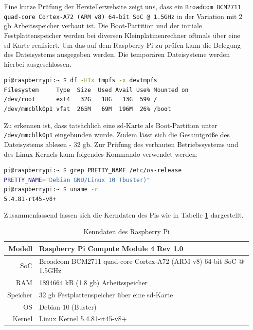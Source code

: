 Eine kurze Prüfung der Herstellerwebsite zeigt uns, dass ein \texttt{Broadcom BCM2711 quad-core Cortex-A72 (ARM v8) 64-bit SoC @ 1.5GHz}
in der Variation mit \num{2} \gls{gb} Arbeitsspeicher verbaut ist.
Die Boot-Partition und der initiale Festplattenspeicher werden bei diversen Kleinplatinenrechner oftmals über eine \gls{sd}-Karte
realisiert.
Um das auf dem Raspberry Pi zu prüfen kann die Belegung des Dateisystems ausgegeben werden.
Die temporären Dateisysteme werden hierbei ausgeschlossen.

\begin{lstlisting}[language=sh, label=lst:pi-sd]
pi@raspberrypi:~ $ df -HTx tmpfs -x devtmpfs
Filesystem     Type  Size  Used Avail Use% Mounted on
/dev/root      ext4   32G   18G   13G  59% /
/dev/mmcblk0p1 vfat  265M   69M  196M  26% /boot
\end{lstlisting}

Zu erkennen ist, dass tatsächlich eine \gls{sd}-Karte als Boot-Partition unter \texttt{/dev/mmcblk0p1} eingebunden wurde.
Zudem lässt sich die Gesamtgröße des Dateisystems ablesen - \num{32} \gls{gb}.
Zur Prüfung des verbauten Betriebssystems und des Linux Kernels kann folgendes Kommando verwendet werden:

\begin{lstlisting}[language=sh, label=lst:pi-os]
pi@raspberrypi:~ $ grep PRETTY_NAME /etc/os-release
PRETTY_NAME="Debian GNU/Linux 10 (buster)"
pi@raspberrypi:~ $ uname -r
5.4.81-rt45-v8+
\end{lstlisting}

Zusammenfassend lassen sich die Kerndaten des Pis wie in Tabelle \ref{tab:data-raspi} dargestellt.

\begin{table}[h]
    \centering
    \begin{tabular}{|r|l|}
        \hline
        Modell   & Raspberry Pi Compute Module 4 Rev 1.0\\ \hline
        SoC      & Broadcom BCM2711 quad-core Cortex-A72 (ARM v8) 64-bit SoC @ 1.5GHz\\ \hline
        RAM      & \num{1894664} kB (\num{1,8} \gls{gb}) Arbeitsspeicher\\ \hline
        Speicher & \num{32} \gls{gb} Festplattenspeicher über eine \gls{sd}-Karte\\ \hline
        OS       & Debian 10 (Buster)\\ \hline
        Kernel   & Linux Kernel 5.4.81-rt45-v8+ \\ \hline
    \end{tabular}\caption{Kenndaten des Raspberry Pi}\label{tab:data-raspi}
\end{table}

